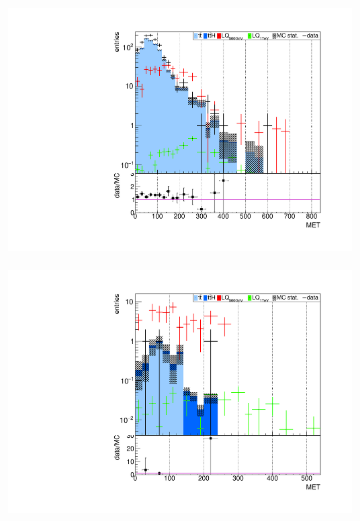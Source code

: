 \begin{figure}
  \centering
                \begin{subfigure}[t]{0.49\textwidth}
                \includegraphics[width=\textwidth]{figures/plots/kinLQ75/MET_2j2b_1tau.pdf}
                \label{MET:2b1tau}
                \end{subfigure}
                \begin{subfigure}[t]{0.49\textwidth}
                \includegraphics[width=\textwidth]{figures/plots/kinLQ75/MET_2j2b_2tau.pdf}
                \label{MET:2b2tau}

\end{subfigure}
\end{figure}
